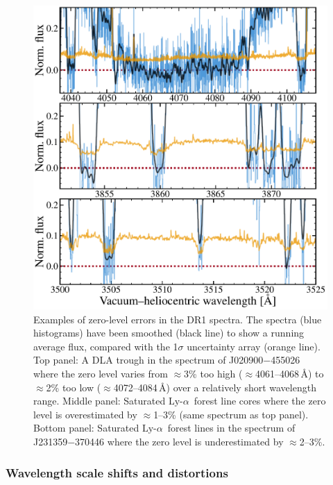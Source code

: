 \documentclass[fleqn,usenatbib,usedcolumn]{mnras}
\newcommand{\lya}{\ensuremath{\textrm{Ly-}\alpha}}
\begin{document}
\begin{figure}
\begin{center}
\includegraphics[width=0.95\columnwidth]{DR1_zero_level.pdf}
\vspace{-1em}
\caption{Examples of zero-level errors in the DR1 spectra. The spectra (blue histograms) have been smoothed (black line) to show a running average flux, compared with the 1$\sigma$ uncertainty array (orange line). Top panel: A DLA trough in the spectrum of J020900$-$455026 where the zero level varies from $\approx$3\% too high ($\approx$4061--4068\,\AA) to $\approx$2\% too low ($\approx$4072--4084\,\AA) over a relatively short wavelength range. Middle panel: Saturated \lya\ forest line cores where the zero level is overestimated by $\approx$1--3\% (same spectrum as top panel). Bottom panel: Saturated \lya\ forest lines in the spectrum of J231359$-$370446 where the zero level is underestimated by $\approx$2--3\%.}
\label{f:zero}
\end{center}
\end{figure}


\subsubsection{Wavelength scale shifts and distortions}\label{sss:wave}
\end{document}
